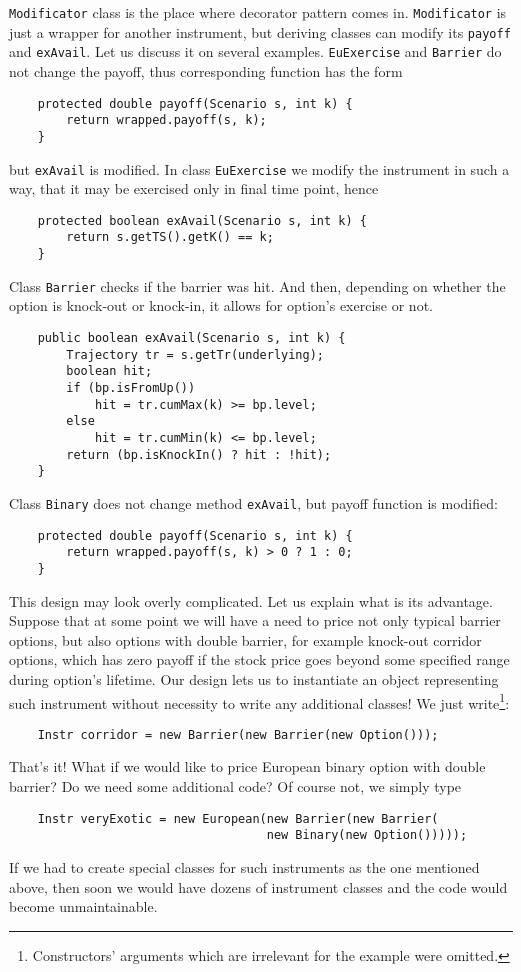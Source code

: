 \documentclass[a4paper,12pt, oneside]{book}
\theoremstyle{definition}
\theoremstyle{remark}
\begin{document}
\texttt{Modificator} class is the place where decorator pattern comes in. \texttt{Modificator} is just a wrapper for another instrument, but deriving classes can modify its \texttt{payoff} and \texttt{exAvail}. Let us discuss it on several examples. \texttt{EuExercise} and \texttt{Barrier} do not change the payoff, thus corresponding function has the form
\begin{lstlisting}
    protected double payoff(Scenario s, int k) {
        return wrapped.payoff(s, k);
    }
\end{lstlisting}
but \texttt{exAvail} is modified. In class \texttt{EuExercise} we modify the instrument in such a way, that it may be exercised only in final time point, hence
\begin{lstlisting}
    protected boolean exAvail(Scenario s, int k) {
        return s.getTS().getK() == k;
    }
\end{lstlisting}
Class \texttt{Barrier} checks if the barrier was hit. And then, depending on whether the option is knock-out or knock-in, it allows for option's exercise or not. 
\begin{lstlisting}
    public boolean exAvail(Scenario s, int k) {
        Trajectory tr = s.getTr(underlying);
        boolean hit;
        if (bp.isFromUp())
            hit = tr.cumMax(k) >= bp.level;
        else
            hit = tr.cumMin(k) <= bp.level;
        return (bp.isKnockIn() ? hit : !hit);
    }
\end{lstlisting}
Class \texttt{Binary} does not change method \texttt{exAvail}, but payoff function is modified:
\begin{lstlisting}
    protected double payoff(Scenario s, int k) {
        return wrapped.payoff(s, k) > 0 ? 1 : 0;
    }
\end{lstlisting}
	
This design may look overly complicated. Let us explain what is its advantage. Suppose that at some point we will have a need to price not only typical barrier options, but also options with double barrier, for example knock-out corridor options, which has zero payoff if the stock price goes beyond some specified range during option's lifetime. Our design lets us to instantiate an object representing such instrument without necessity to write any additional classes! We just write\footnote{Constructors' arguments which are irrelevant for the example were omitted.}:
\begin{lstlisting}
    Instr corridor = new Barrier(new Barrier(new Option()));
\end{lstlisting}
That's it! What if we would like to price European binary option with double barrier? Do we need some additional code? Of course not, we simply type
\begin{lstlisting}
    Instr veryExotic = new European(new Barrier(new Barrier(
                                    new Binary(new Option()))));
\end{lstlisting}
If we had to create special classes for such instruments as the one mentioned above, then soon we would have dozens of instrument classes and the code would become unmaintainable.
	
\end{document}
